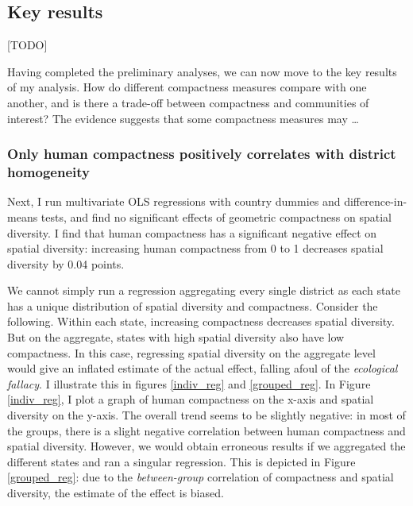 \documentclass[]{article}
\begin{document}
\hypertarget{key-results}{%
\subsection{Key results}\label{key-results}}

{[}TODO{]}

Having completed the preliminary analyses, we can now move to the key
results of my analysis. How do different compactness measures compare
with one another, and is there a trade-off between compactness and
communities of interest? The evidence suggests that some compactness
measures may \ldots{}

\hypertarget{only-human-compactness-positively-correlates-with-district-homogeneity}{%
\subsubsection{Only human compactness positively correlates with
district
homogeneity}\label{only-human-compactness-positively-correlates-with-district-homogeneity}}

Next, I run multivariate OLS regressions with country dummies and
difference-in-means tests, and find no significant effects of geometric
compactness on spatial diversity. I find that human compactness has a
significant negative effect on spatial diversity: increasing human
compactness from 0 to 1 decreases spatial diversity by 0.04 points.

We cannot simply run a regression aggregating every single district as
each state has a unique distribution of spatial diversity and
compactness. Consider the following. Within each state, increasing
compactness decreases spatial diversity. But on the aggregate, states
with high spatial diversity also have low compactness. In this case,
regressing spatial diversity on the aggregate level would give an
inflated estimate of the actual effect, falling afoul of the
\emph{ecological fallacy}. I illustrate this in figures \ref{indiv_reg}
and \ref{grouped_reg}. In Figure \ref{indiv_reg}, I plot a graph of
human compactness on the x-axis and spatial diversity on the y-axis. The
overall trend seems to be slightly negative: in most of the groups,
there is a slight negative correlation between human compactness and
spatial diversity. However, we would obtain erroneous results if we
aggregated the different states and ran a singular regression. This is
depicted in Figure \ref{grouped_reg}: due to the \emph{between-group}
correlation of compactness and spatial diversity, the estimate of the
effect is biased.
\end{document}
